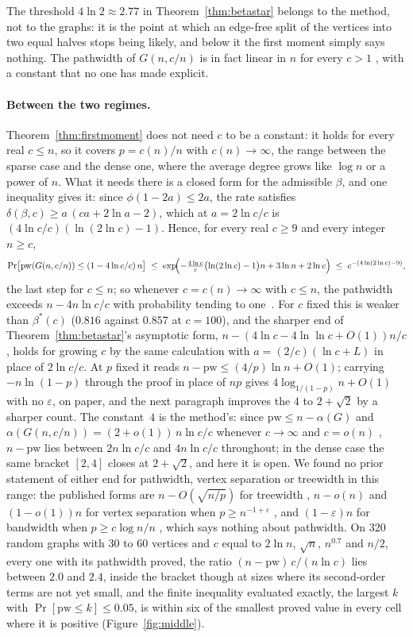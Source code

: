 The threshold $4\ln2\approx2.77$ in Theorem~\ref{thm:betastar} belongs to the
method, not to the graphs: it is the point at which an edge-free split of the
vertices into two equal halves stops being likely, and below it the first
moment simply says nothing. The pathwidth of $G(n,c/n)$ is in fact linear in
$n$ for every $c>1$ \citep{LeeLeeOum2012}, with a constant that no one has
made explicit.

\paragraph{Between the two regimes.}
Theorem~\ref{thm:firstmoment} does not need $c$ to be a constant: it holds for
every real $c\le n$, so it covers $p=c(n)/n$ with $c(n)\to\infty$, the range
between the sparse case and the dense one, where the average degree grows like
$\log n$ or a power of $n$. What it needs there is a closed form for the
admissible $\beta$, and one inequality gives it: since $\phi(1-2a)\le2a$,
the rate satisfies $\delta(\beta,c)\ge a\,(ca+2\ln a-2)$, which at
$a=2\ln c/c$ is $(4\ln c/c)(\ln(2\ln c)-1)$. Hence, for every real $c\ge9$ and
every integer $n\ge c$,
\[
  \Pr\bigl[\mathrm{pw}(G(n,c/n))\le(1-4\ln c/c)\,n\bigr]
  \;\le\;\exp\!\Bigl(-\tfrac{4\ln c}{c}\bigl(\ln(2\ln c)-1\bigr)n+3\ln n+2\ln c\Bigr)
  \;\le\; c^{-(4\ln(2\ln c)-9)},
\]
the last step for $c\le n$; so whenever $c=c(n)\to\infty$ with $c\le n$, the
pathwidth exceeds $n-4n\ln c/c$ with probability tending to one~.
For $c$ fixed this is weaker than $\beta^{*}(c)$ ($0.816$ against $0.857$ at
$c=100$), and the sharper end of Theorem~\ref{thm:betastar}'s asymptotic form,
$n-(4\ln c-4\ln\ln c+O(1))n/c$, holds for growing $c$ by the same calculation
with $a=(2/c)(\ln c+L)$ in place of $2\ln c/c$. At $p$ fixed it reads
$n-\mathrm{pw}\le(4/p)\ln n+O(1)$; carrying $-n\ln(1-p)$ through the proof in
place of $np$ gives $4\log_{1/(1-p)}n+O(1)$ with no $\varepsilon$, on paper, and
the next paragraph improves the $4$ to $2+\sqrt2$ by a sharper count.
The constant~$4$ is the method's: since $\mathrm{pw}\le n-\alpha(G)$ and
$\alpha(G(n,c/n))=(2+o(1))\,n\ln c/c$ whenever $c\to\infty$ and $c=o(n)$
\citep{Frieze1990}, $n-\mathrm{pw}$ lies between $2n\ln c/c$ and $4n\ln c/c$
throughout; in the dense case the same bracket $[2,4]$ closes at $2+\sqrt2$, and
here it is open. We found no prior statement
of either end for pathwidth, vertex separation or treewidth in this range: the
published forms are $n-O(\sqrt{n/p})$ for treewidth \citep{PerarnauSerra2014},
$n-o(n)$ \citep{WangLiuCuiXu2011} and $(1-o(1))n$ for vertex separation when
$p\ge n^{-1+\varepsilon}$ \citep{CheungGirardet2020}, and
$(1-\varepsilon)n$ for bandwidth when $p\ge c\log n/n$ \citep{Turner1986},
which says nothing about pathwidth. On 320 random graphs with 30 to 60
vertices and $c$ equal to $2\ln n$, $\sqrt n$, $n^{0.7}$ and $n/2$, every one
with its pathwidth proved, the ratio $(n-\mathrm{pw})\,c/(n\ln c)$ lies between
$2.0$ and $2.4$, inside the bracket though at sizes where its second-order
terms are not yet small, and the finite inequality evaluated exactly, the
largest $k$ with $\Pr[\mathrm{pw}\le k]\le0.05$, is within six of the
smallest proved value in every cell where it is positive
(Figure~\ref{fig:middle}).

